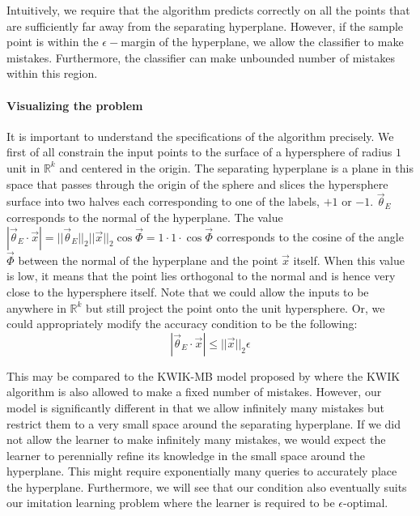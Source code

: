 Intuitively, we require that the algorithm predicts correctly on all the points that are sufficiently far away from the separating hyperplane. However, if the sample point is within the $\epsilon-$margin of the hyperplane, we allow the classifier to make mistakes. Furthermore, the classifier can make unbounded number of mistakes within this region.

\paragraph{Visualizing the problem} It is important to understand the specifications of the algorithm precisely. We first of all constrain the input points to the surface of a hypersphere of radius $1$ unit in $\mathbb{R}^k$ and centered in the origin. The separating hyperplane is a plane in this space that passes through the origin of the sphere and slices the hypersphere surface into two halves each corresponding to one of the labels, $+1$ or $-1$. $\vec{\theta}_E$ corresponds to the normal of the hyperplane. The value $|\vec{\theta}_E \cdot \vec{x}| = ||\vec{\theta}_E||_2 ||\vec{x} ||_2 \cos\vec{\Phi} = 1 \cdot 1 \cdot \cos \vec{\Phi}  $ corresponds to the cosine of the angle $\vec{\Phi}$ between the normal of the hyperplane and the point $\vec{x}$ itself. When this value is low, it means that the point lies orthogonal to the normal and is hence very close to the hypersphere itself. 
Note that we could allow the inputs to be anywhere in $\mathbb{R}^k$ but still project the point onto the unit hypersphere. Or, we could appropriately modify the accuracy condition to be the following:
\begin{equation}
 |\vec{\theta}_E \cdot \vec{x}| \leq ||\vec{x}||_2 \epsilon
\end{equation}

This may be compared to the KWIK-MB model proposed by \citet{DBLP:conf/nips/SayediZB10}  where the KWIK algorithm is also allowed to make a fixed number of mistakes. However, our model is significantly different in that we allow infinitely many mistakes but restrict them to a very small space around the separating hyperplane. If we did not allow the learner to make infinitely many mistakes, we would expect the learner to perennially refine its knowledge in the small space around the hyperplane. This might require exponentially many queries to accurately place the hyperplane. Furthermore, we will see that our condition also eventually suits our imitation learning problem where the learner is required to be $\epsilon$-optimal.   


